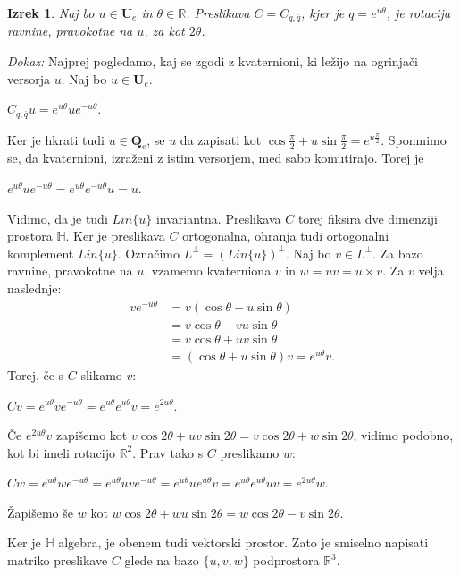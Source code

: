 \documentclass[a4paper,12pt]{article}
\def\R{\mathbb{R}} %
\def\H{\mathbb{H}} %
\def\Qe{\textbf{Q}_{e}} %
\def\Ue{\textbf{U}_{e}} %
\newcommand{\conj}[1]{\overline{#1}}
\newtheorem{izrek}{Izrek}
\begin{document}
\begin{izrek}
Naj bo $u \in \Ue$ in $\theta \in \R$. Preslikava $C = C_{q, \conj{q}}$, kjer je $q = e^{u\theta}$, je rotacija ravnine, 
pravokotne na $u$, za kot $2\theta$.
\end{izrek}
\break
\noindent
{\em Dokaz:\/} Najprej pogledamo, kaj se zgodi z kvaternioni, ki ležijo na ogrinjači versorja $u$.
Naj bo $u \in \Ue$.
\begin{center}
   $C_{q,\conj{q}}u = e^{u\theta} u e^{-u\theta}$.
\end{center}
Ker je hkrati tudi $u \in \Qe$, se $u$ da zapisati kot $\cos\frac{\pi}{2} + u\sin\frac{\pi}{2} = e^{u\frac{\pi}{2}}$.
Spomnimo se, da kvaternioni, izraženi z istim versorjem, med sabo komutirajo. Torej je
\begin{center}
   $e^{u\theta} u e^{-u\theta} = e^{u\theta}e^{-u\theta}u = u$.
\end{center}
Vidimo, da je tudi $Lin\{u\}$ invariantna. Preslikava $C$ torej fiksira dve dimenziji prostora $\H$.
Ker je preslikava $C$ ortogonalna, ohranja tudi ortogonalni komplement $Lin\{u\}$.
Označimo $L^{\bot} = (Lin\{u\})^{\bot}$. Naj bo $v \in L^{\bot}$. Za bazo ravnine, pravokotne na $u$, vzamemo kvaterniona $v$ in $w = uv = u \times v$.
Za $v$ velja naslednje:
\begin{align*}
   v e^{-u\theta} & = v(\cos\theta -u\sin\theta) \\
   & = v\cos\theta -vu \sin\theta \\
   & = v\cos\theta + uv\sin\theta \\
   & = (\cos\theta +u\sin\theta)v = e^{u\theta}v.
\end{align*}
Torej, če s $C$ slikamo $v$:
\begin{center}
   $Cv = e^{u\theta}v e^{-u\theta} = e^{u\theta}e^{u\theta}v = e^{2u\theta}$.
\end{center}
Če $e^{2u\theta}v$ zapišemo kot $v\cos2\theta + uv\sin2\theta = v\cos2\theta + w\sin2\theta$, vidimo podobno, kot bi imeli rotacijo $\R^2$. Prav tako s $C$ preslikamo $w$:
\begin{center}
   $Cw = e^{u\theta}w e^{-u\theta} = e^{u\theta}uve^{-u\theta} = e^{u\theta}ue^{u\theta}v = e^{u\theta}e^{u\theta}uv = e^{2u\theta}w$.
\end{center}
Žapišemo še $w$ kot $w\cos2\theta + wu\sin2\theta = w\cos2\theta - v\sin2\theta$.

Ker je $\H$ algebra, je obenem tudi vektorski prostor. Zato je smiselno napisati matriko preslikave $C$ glede na bazo $\{u, v, w\}$ podprostora $\R^3$.
\end{document}
